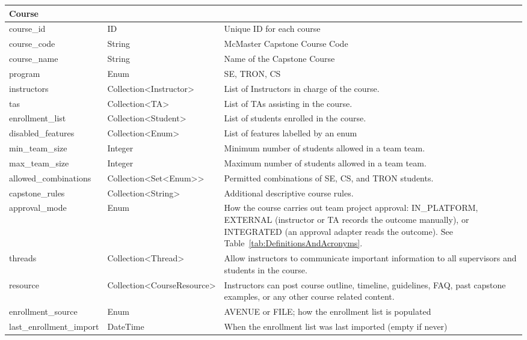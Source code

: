 \documentclass[12pt]{article}
\newcounter{tin}
\begin{document}
\begin{longtable}{|
      p{}|
      p{}|
      p{}|
  }
      \multicolumn{3}{|l|}{\textbf{Course}}\\ \hline
      course\_id & ID & Unique ID for each course \\ \hline
      course\_code & String & McMaster Capstone Course Code \\ \hline
      course\_name & String & Name of the Capstone Course \\ \hline
      program & Enum & SE, TRON, CS \\ \hline
      instructors & Collection\textless Instructor\textgreater & List of Instructors in charge of the course. \\ \hline
      tas & Collection\textless TA\textgreater & List of TAs assisting in the course. \\ \hline
      enrollment\_list & Collection\textless Student\textgreater & List of students enrolled in the course. \\ \hline
      disabled\_features & Collection\textless Enum\textgreater & List of features labelled by an enum \\ \hline
      min\_team\_size & Integer & Minimum number of students allowed in a team team. \\ \hline
      max\_team\_size & Integer & Maximum number of students allowed in a team team. \\ \hline
      allowed\_combinations & Collection\textless Set\textless Enum\textgreater\textgreater & Permitted combinations of SE, CS, and TRON students. \\ \hline
      capstone\_rules & Collection\textless String\textgreater & Additional descriptive course rules. \\ \hline
      approval\_mode & Enum & How the course carries out team project approval: IN\_PLATFORM, EXTERNAL (instructor or TA records the outcome manually), or INTEGRATED (an approval adapter reads the outcome). See Table~\ref{tab:DefinitionsAndAcronyms}. \\ \hline
      threads & Collection\textless Thread\textgreater & Allow instructors to communicate important information to all supervisors and students in the course. \\ \hline
      resource & Collection\textless CourseResource\textgreater & Instructors can post course outline, timeline, guidelines, FAQ, past capstone examples, or any other course related content. \\ \hline
      enrollment\_source & Enum & AVENUE or FILE; how the enrollment list is populated \\ \hline
      last\_enrollment\_import & DateTime & When the enrollment list was last imported (empty if never) \\ \hline


\end{longtable}
\end{document}
